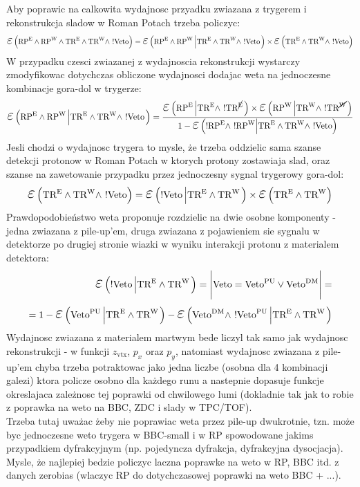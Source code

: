 Aby poprawic na calkowita wydajnosc przyadku zwiazana z trygerem i rekonstrukcja sladow w Roman Potach trzeba policzyc:
\begin{equation}
\mbox{\LARGE$\varepsilon$}\left(\RPE\land\RPW\land\TRE\land\TRW\land~!\V\right) = \mbox{\LARGE$\varepsilon$}\left(\RPE\land\RPW\left|\TRE\land\TRW\land~!\V\right.\right)\times\mbox{\LARGE$\varepsilon$}\left(\TRE\land\TRW\land~!\V\right)
\end{equation}
W przypadku czesci zwiazanej z wydajnoscia rekonstrukcji wystarczy zmodyfikowac dotychczas obliczone wydajnosci dodajac weta na jednoczesne kombinacje gora-dol w trygerze:
\begin{equation}
\mbox{\LARGE$\varepsilon$}\left(\RPE\land\RPW\left|\TRE\land\TRW\land~!\V\right.\right)=\frac{\mbox{\LARGE$\varepsilon$}\left(\RPE\left|\TRE\land~!\TRNE\right.\right) \times \mbox{\LARGE$\varepsilon$}\left(\RPW\left|\TRW\land~!\TRNW\right.\right)}{1-\mbox{\LARGE$\varepsilon$}\left(!\RPE\land~!\RPW\Big|\TRE\land\TRW\land~!\V\Big.\right)}
\end{equation}
Jesli chodzi o wydajnosc trygera to mysle, że trzeba oddzielic sama szanse detekcji protonow w Roman Potach w ktorych protony zostawiaja slad, oraz szanse na zawetowanie przypadku przez jednoczesny sygnal trygerowy gora-dol:
\begin{equation}
\mbox{\LARGE$\varepsilon$}\left(\TRE\land\TRW\land~!\V\right) = \mbox{\LARGE$\varepsilon$}\left(!\V\left|\TRE\land\TRW\right.\right)\times\mbox{\LARGE$\varepsilon$}\left(\TRE\land\TRW\right)
\end{equation}
Prawdopodobieństwo weta proponuje rozdzielic na dwie osobne komponenty - jedna zwiazana z pile-up'em, druga zwiazana z pojawieniem sie sygnalu w detektorze po drugiej stronie wiazki w wyniku interakcji protonu z materialem detektora:
\begin{equation}
\begin{split}
\mbox{\LARGE$\varepsilon$}\left(!\V\left|\TRE\land\TRW\right.\right)=\Bigg|\V=\Vpu\vee\Vdm\Bigg|=\\=1-\mbox{\LARGE$\varepsilon$}\left(\Vpu\left|\TRE\land\TRW\right.\right)-\mbox{\LARGE$\varepsilon$}\left(\Vdm\land~!\Vpu\left|\TRE\land\TRW\right.\right)
\end{split}
\end{equation}
Wydajnosc zwiazana z materialem martwym bede liczyl tak samo jak wydajnosc rekonstrukcji - w funkcji $z_{\text{vtx}}$, $p_{x}$ oraz $p_{y}$, natomiast wydajnosc zwiazana z pile-up'em chyba trzeba potraktowac jako jedna liczbe (osobna dla 4 kombinacji galezi) ktora policze osobno dla każdego runu a nastepnie dopasuje funkcje okreslajaca zależnosc tej poprawki od chwilowego lumi (dokladnie tak jak to robie z poprawka na weto na BBC, ZDC i slady w TPC/TOF).\\
Trzeba tutaj uważac żeby nie poprawiac weta przez pile-up dwukrotnie, tzn. może byc jednoczesne weto trygera w BBC-small i w RP spowodowane jakims przypadkiem dyfrakcyjnym (np. pojedyncza dyfrakcja, dyfrakcyjna dysocjacja). Mysle, że najlepiej bedzie policzyc laczna poprawke na weto w RP, BBC itd. z danych zerobias (wlaczyc RP do dotychczasowej poprawki na weto BBC + ...).\\



